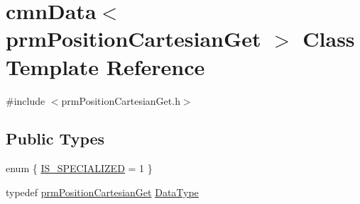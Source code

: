 \hypertarget{classcmn_data_3_01prm_position_cartesian_get_01_4}{}\section{cmn\+Data$<$ prm\+Position\+Cartesian\+Get $>$ Class Template Reference}
\label{classcmn_data_3_01prm_position_cartesian_get_01_4}


{\ttfamily \#include $<$prm\+Position\+Cartesian\+Get.\+h$>$}

\subsection*{Public Types}
\begin{DoxyCompactItemize}
\item 
enum \{ \hyperlink{classcmn_data_3_01prm_position_cartesian_get_01_4_a8434841f9b5f55a6f6c6aea4ad73432eaa35464157c7a973842df69ab3f77f317}{I\+S\+\_\+\+S\+P\+E\+C\+I\+A\+L\+I\+Z\+E\+D} = 1
 \}
\item 
typedef \hyperlink{classprm_position_cartesian_get}{prm\+Position\+Cartesian\+Get} \hyperlink{classcmn_data_3_01prm_position_cartesian_get_01_4_a4c0c73a046fbb0962651979bd5734bbd}{Data\+Type}
\end{DoxyCompactItemize}
